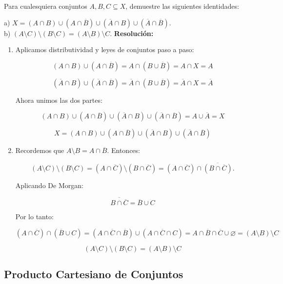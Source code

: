 \documentclass[a4paper,12pt]{article}
\begin{document}
\begin{ejercicio}[title=Ejercicio 7]
Para cualesquiera conjuntos $A,B,C\subseteq X$, demuestre las siguientes identidades:

a) $X = (A\cap B)\cup (A\cap \overline{B})\cup (\overline{A}\cap B)\cup (\overline{A}\cap \overline{B})$.\\
b) $(A\setminus C)\setminus (B\setminus C) = (A\setminus B)\setminus C$.
\tcblower
\textbf{Resolución:}

\begin{enumerate}
\item[\textbf{a)}] 
Aplicamos distributividad y leyes de conjuntos paso a paso:

\[
(A\cap B)\cup (A\cap \overline{B}) = A \cap (B \cup \overline{B}) = A \cap X = A
\]

\[
(\overline{A}\cap B)\cup (\overline{A}\cap \overline{B}) = \overline{A} \cap (B \cup \overline{B}) = \overline{A} \cap X = \overline{A}
\]

Ahora unimos las dos partes:

\[
(A\cap B)\cup (A\cap \overline{B}) \cup (\overline{A}\cap B)\cup (\overline{A}\cap \overline{B}) = A \cup \overline{A} = X
\]

\[
\boxed{X = (A\cap B)\cup (A\cap \overline{B})\cup (\overline{A}\cap B)\cup (\overline{A}\cap \overline{B})}
\]

\item[\textbf{b)}] 
Recordemos que $A\setminus B = A\cap \overline{B}$. Entonces:

\[
(A\setminus C)\setminus (B\setminus C) = (A\cap \overline{C}) \setminus (B\cap \overline{C}) = (A\cap \overline{C}) \cap \overline{(B\cap \overline{C})}.
\]

Aplicando De Morgan:

\[
\overline{B\cap \overline{C}} = \overline{B} \cup C
\]

Por lo tanto:

\[
(A\cap \overline{C}) \cap (\overline{B} \cup C) = (A\cap \overline{C} \cap \overline{B}) \cup (A\cap \overline{C} \cap C) = A \cap \overline{B} \cap \overline{C} \cup \varnothing = (A\setminus B)\setminus C
\]

\[
\boxed{(A\setminus C)\setminus (B\setminus C) = (A\setminus B)\setminus C}
\]

\end{enumerate}

\end{ejercicio}

\subsection{Producto Cartesiano de Conjuntos}
\end{document}
